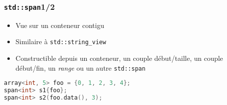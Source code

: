\documentclass[C++.tex]{subfiles}
\begin{document}
\begin{frame}[fragile]
	\frametitle{\lstinline|std::span|\titlehfill{}1/2}
	\begin{itemize}
		\item Vue sur un conteneur contigu


		\item Similaire à \lstinline|std::string_view|
		\item Constructible depuis un conteneur, un couple début/taille, un couple début/fin, un \textit{range} ou un autre \lstinline|std::span|
	\end{itemize}

	\begin{lstlisting}[language=C++]
array<int, 5> foo = {0, 1, 2, 3, 4};
span<int> s1{foo};
span<int> s2(foo.data(), 3);\end{lstlisting}
\end{frame}
\end{document}
